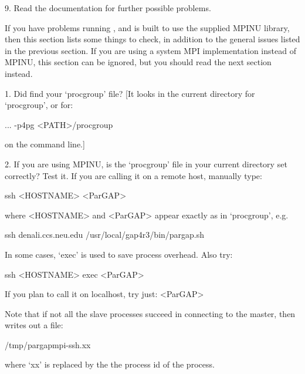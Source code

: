 \item{9.}
    Read the documentation for further possible problems.

\endlist


If you have problems running {\ParGAP}, and {\ParGAP} is built to use the 
supplied MPINU library, then this section lists some things to check, in 
addition to the general issues listed in the previous section. If you are
using a system MPI implementation instead of MPINU, this section can be 
ignored, but you should read the next section instead.


\beginlist
\item{1.}
    Did {\ParGAP} find your `procgroup' file?
    [It looks in the current directory for `procgroup', or for:

... -p4pg <PATH>/procgroup

\item{}
    on the command line.]

\item{2.}
    If you are using MPINU, is the `procgroup' file in your current directory 
    set correctly? Test it. If you are calling it on a remote host, manually 
    type:

ssh <HOSTNAME> <ParGAP>

\item{}
    where <HOSTNAME> and <ParGAP> appear exactly as in `procgroup', e.g.
    
ssh denali.ccs.neu.edu /usr/local/gap4r3/bin/pargap.sh

\item{}
    In some cases, `exec' is used to save process overhead. Also try:

ssh <HOSTNAME> exec <ParGAP>

\item{}
    If you plan to call it on localhost, try just:   <ParGAP>

\item{}
    Note that if not all the slave processes succeed in connecting
    to the master, then {\ParGAP} writes out a file:

\begintt
/tmp/pargapmpi-ssh.xx
\endtt
       
\item{}
    where `xx' is replaced by the  the  process  id  of  the  {\ParGAP}
    process.

